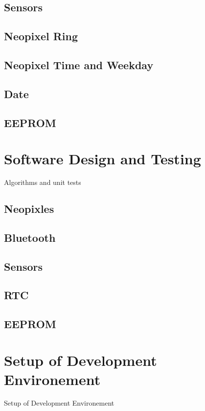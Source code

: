 \subsection{Sensors}
\subsection{Neopixel Ring}
\subsection{Neopixel Time and Weekday} 
\subsection{Date}
\subsection{EEPROM}


\section{Software Design and Testing}
Algorithms and unit tests
\subsection{Neopixles}
\subsection{Bluetooth}
\subsection{Sensors} 
\subsection{RTC}
\subsection{EEPROM}


\section{Setup of Development Environement}
Setup of Development Environement
